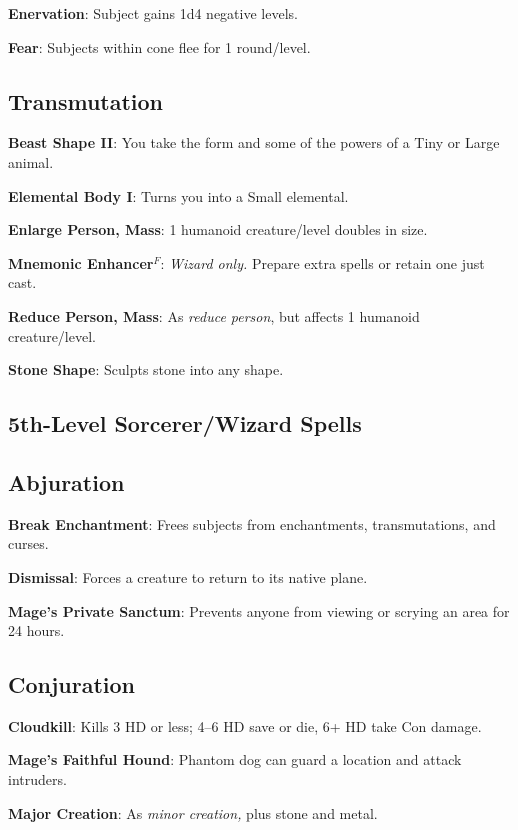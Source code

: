 \textbf{Enervation}: Subject gains 1d4 negative levels.

\textbf{Fear}: Subjects within cone flee for 1 round/level.

\subsection{Transmutation}


\textbf{Beast Shape II}: You take the form and some of the powers of a Tiny or Large animal.

\textbf{Elemental Body I}: Turns you into a Small elemental.

\textbf{Enlarge Person, Mass}: 1 humanoid creature/level doubles in size.

\textbf{Mnemonic Enhancer}\(^{F}\): \textit{Wizard only. }Prepare extra spells or retain one just cast.

\textbf{Reduce Person, Mass}: As \textit{reduce person}, but affects 1 humanoid creature/level.

\textbf{Stone Shape}: Sculpts stone into any shape.

\subsection{5th-Level Sorcerer/Wizard Spells}


\subsection{Abjuration}


\textbf{Break Enchantment}: Frees subjects from enchantments, transmutations, and curses.

\textbf{Dismissal}: Forces a creature to return to its native plane.

\textbf{Mage's Private Sanctum}: Prevents anyone from viewing or scrying an area for 24 hours.

\subsection{Conjuration}


\textbf{Cloudkill}: Kills 3 HD or less; 4--6 HD save or die, 6+ HD take Con damage.

\textbf{Mage's Faithful Hound}: Phantom dog can guard a location and attack intruders.

\textbf{Major Creation}: As \textit{minor creation, }plus stone and metal.

